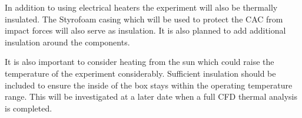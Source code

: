 \documentclass[a4paper,12pt,twoside]{article}
\begin{document}
\begin{centering}
In addition to using electrical heaters the experiment will also be thermally insulated. The Styrofoam casing which will be used to protect the CAC from impact forces will also serve as insulation. It is also planned to add additional insulation around the components.  
\end{centering}

\begin{centering}
It is also important to consider heating from the sun which could raise the temperature of the experiment considerably. Sufficient insulation should be included to ensure the inside of the box stays within the operating temperature range. This will be investigated at a later date when a full CFD thermal analysis is completed.
\end{centering}
\bigskip

\pagebreak
\end{document}
